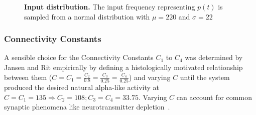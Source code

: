 \begin{figure}[H]
    \centering
    \pgfplotsset{compat = newest}

    \caption{
        \textbf{Input distribution.}
        The input frequency representing $p(t)$ is sampled from a normal distribution with $\mu=220$ and $\sigma=22$}
    \label{fig:ModelInput}
\end{figure}

\subsubsection{Connectivity Constants}\label{subsubsec:connectivity_constants}

A sensible choice for the Connectivity Constants $C_1$ to $C_4$ was determined by Jansen and Rit empirically by
defining a histologically motivated relationship between them ($C = C_1 = \frac{C_2}{0.8} = \frac{C_3}{0.25} =
\frac{C_4}{0.25}$) and varying $C$ until the system produced the desired natural alpha-like activity at $C=C_1=135
\Rightarrow C_2=108; C_3=C_4=33.75$.
Varying $C$ can account for common synaptic phenomena like
neurotransmitter depletion~\parencite{jansen_electroencephalogram_1995}.


